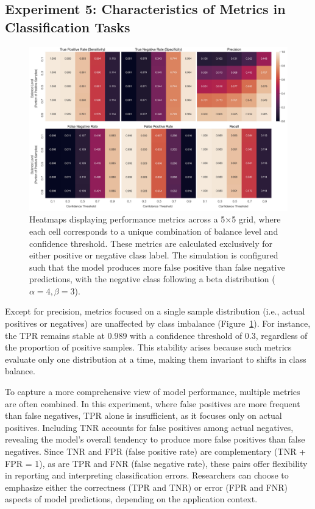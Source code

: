 \subsection{Experiment 5: Characteristics of Metrics in Classification Tasks}

\begin{figure}[H]
    \centering
    \includegraphics[width=1\textwidth]{fig_10.jpg}
    \caption{Heatmaps displaying performance metrics across a 5×5 grid, where each cell corresponds to a unique combination of balance level and confidence threshold. These metrics are calculated exclusively for either positive or negative class label. The simulation is configured such that the model produces more false positive than false negative predictions, with the negative class following a beta distribution ($\alpha = 4, \beta = 3$).} 
    \label{fig:s5_1}
\end{figure}

Except for precision, metrics focused on a single sample distribution (i.e., actual positives or negatives) are unaffected by class imbalance (Figure~\ref{fig:s5_1}). For instance, the TPR remains stable at 0.989 with a confidence threshold of 0.3, regardless of the proportion of positive samples. This stability arises because such metrics evaluate only one distribution at a time, making them invariant to shifts in class balance.

To capture a more comprehensive view of model performance, multiple metrics are often combined. In this experiment, where false positives are more frequent than false negatives, TPR alone is insufficient, as it focuses only on actual positives. Including TNR accounts for false positives among actual negatives, revealing the model’s overall tendency to produce more false positives than false negatives. Since TNR and FPR (false positive rate) are complementary (TNR + FPR = 1), as are TPR and FNR (false negative rate), these pairs offer flexibility in reporting and interpreting classification errors. Researchers can choose to emphasize either the correctness (TPR and TNR) or error (FPR and FNR) aspects of model predictions, depending on the application context.

